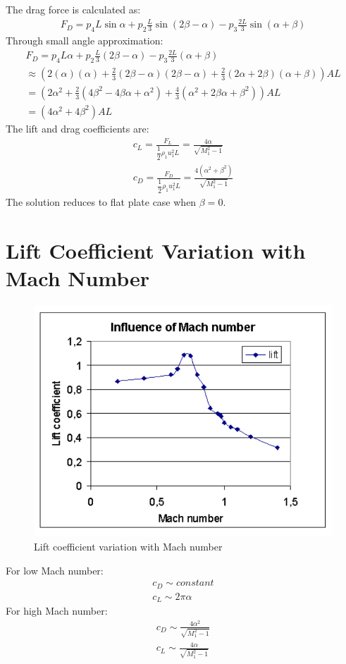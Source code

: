 \documentclass[class=report, crop=false, 12pt,a4paper]{standalone}
\begin{document}
The drag force is calculated as: 
\begin{gather}
    F_D = p_4L\sin\alpha + p_2\frac{L}{3}\sin(2\beta-\alpha) - p_3\frac{2L}{3}\sin(\alpha+\beta)
\end{gather}
Through small angle approximation: 
\begin{gather}
    F_D = p_4L\alpha + p_2\frac{L}{3}(2\beta-\alpha) - p_3\frac{2L}{3}(\alpha+\beta) \\[5pt]
    \approx \left( 2(\alpha)(\alpha) + \frac{2}{3}(2\beta-\alpha)(2\beta-\alpha) + \frac{2}{3}(2\alpha+2\beta)(\alpha+\beta) \right) AL \\[5pt]
    = \left( 2\alpha^2 + \frac{2}{3}(4\beta^2-4\beta\alpha+\alpha^2) + \frac{4}{3}(\alpha^2+2\beta\alpha+\beta^2) \right) AL \\[5pt]
    = (4\alpha^2+4\beta^2)AL
\end{gather}
The lift and drag coefficients are: 
\begin{gather}
    c_L = \frac{F_L}{\dfrac{1}{2}\rho_1 u_1^2 L} = \frac{4\alpha}{\sqrt{M_1^2-1}} \\[5pt]
    c_D = \frac{F_D}{\dfrac{1}{2}\rho_1 u_1^2 L} = \frac{4(\alpha^2+\beta^2)}{\sqrt{M_1^2-1}}
\end{gather}
The solution reduces to flat plate case when $\beta = 0$. 
\section{Lift Coefficient Variation with Mach Number}
\begin{figure}[H]
    \centering
    \includegraphics[width = 0.65 \textwidth]{../img/diagram36.png}
    \caption{Lift coefficient variation with Mach number}
\end{figure}
For low Mach number: 
\begin{gather}
    c_D \sim constant \\[5pt]
    c_L \sim 2\pi\alpha
\end{gather}
For high Mach number: 
\begin{gather}
    c_D \sim \frac{4\alpha^2}{\sqrt{M_1^2-1}} \\[5pt]
    c_L \sim \frac{4\alpha}{\sqrt{M_1^2-1}}
\end{gather}
\end{document}
